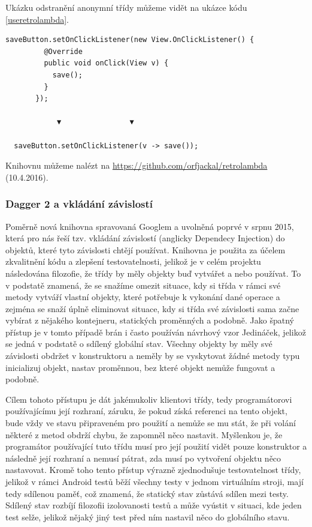 \documentclass[czech,master,public,dept460,male,java,cpdeclaration]{diploma}
\begin{document}
Ukázku odstranění anonymní třídy můžeme vidět na ukázce kódu \ref{useretrolambda}.

\begin{lstlisting}[label=useretrolambda,caption=Odstranění kódu anonymní třídy pomocí knihovny Retrolambda]
   saveButton.setOnClickListener(new View.OnClickListener() {
         @Override
         public void onClick(View v) {
           save();
         }
       });

            ▼                ▼

  saveButton.setOnClickListener(v -> save());
\end{lstlisting}

Knihovnu můžeme nalézt na \url{https://github.com/orfjackal/retrolambda} (10.4.2016).

\subsubsection{Dagger 2 a vkládání závislostí}\label{dagger2}
Poměrně nová knihovna spravovaná Googlem a uvolněná poprvé v srpnu 2015, která pro nás řeší tzv. vkládání
závislostí (anglicky Dependecy Injection) do objektů,
které tyto závislosti chtějí používat. Knihovna je použita za účelem zkvalitnění kódu a zlepšení testovatelnosti, jelikož
je v celém projektu následována filozofie, že třídy by měly objekty buď vytvářet a nebo používat. To v podstatě znamená,
že se snažíme omezit situace, kdy si třída v rámci své metody vytváří vlastní objekty, které potřebuje k vykonání
dané operace a zejména se snaží úplně eliminovat situace, kdy si třída své závislosti sama začne vybírat z nějakého
kontejneru, statických proměnných a podobně. Jako špatný přístup je v tomto případě brán i často používán návrhový vzor
Jedináček, jelikož se jedná v podstatě o sdílený globální stav. Všechny objekty by měly své závislosti obdržet v konstruktoru
a neměly by se vyskytovat žádné metody typu inicializuj objekt, nastav proměnnou, bez které objekt nemůže fungovat a podobně.

Cílem tohoto přístupu je dát jakémukoliv klientovi třídy, tedy programátorovi používajícímu její rozhraní,
záruku, že pokud získá referenci na tento objekt, bude vždy ve stavu připraveném pro použití a nemůže se mu stát,
že při volání některé z metod obdrží chybu, že zapomněl něco nastavit. Myšlenkou je, že programátor používající
tuto třídu musí pro její použití vidět pouze konstruktor a následně její rozhraní a nemusí pátrat, zda musí po
vytvoření objektu něco nastavovat. Kromě toho tento přístup výrazně zjednodušuje testovatelnost třídy, jelikož v rámci
Android testů běží všechny testy v jednom virtuálním stroji, mají tedy sdílenou paměť, což znamená, že statický
stav zůstává sdílen mezi testy. Sdílený stav rozbíjí filozofii izolovanosti testů a může vyústit v situaci, kde jeden test selže,
jelikož nějaký jiný test před ním nastavil něco do globálního stavu.
\end{document}
